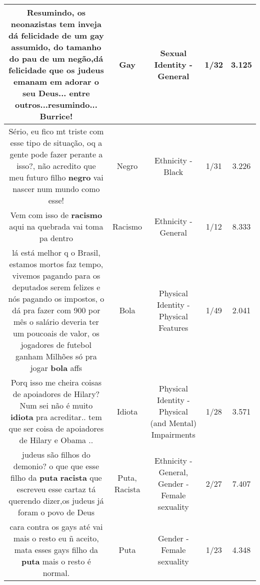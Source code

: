 \documentclass[11pt]{article}
\newlength\mylength
\begin{document}
\begin{center}
\begin{longtable}{|C{.65\mylength}|C{.30\mylength}|C{.12\mylength}|C{.12\mylength}|C{.12\mylength}|}
  \small Resumindo, os neonazistas tem inveja dá felicidade de um \textbf{gay} assumido, do tamanho do pau de um negão,dá felicidade que os judeus emanam em adorar o seu Deus... entre outros...resumindo... Burrice!\normalsize   & Gay & Sexual Identity - General & 1/32 & 3.125 \\  \hline
  \small Sério, eu fico mt triste com esse tipo de situação, oq a gente pode fazer perante a isso?, não acredito que meu futuro filho \textbf{negro} vai nascer num mundo como esse!\normalsize   & Negro & Ethnicity - Black & 1/31 & 3.226 \\  \hline
  \small Vem com isso de \textbf{racismo} aqui na quebrada vai toma pa dentro\normalsize   & Racismo & Ethnicity - General & 1/12 & 8.333 \\  \hline
  \small lá está melhor q o Brasil, estamos mortos faz tempo, vivemos pagando para os deputados serem felizes e nós pagando os impostos, o dá pra fazer com 900 por mês o salário deveria ter um poucoais de valor, os jogadores de futebol ganham Milhões só pra jogar \textbf{bola} affs\normalsize   & Bola & Physical Identity - Physical Features & 1/49 & 2.041 \\  \hline
  \small Porq isso me cheira coisas de apoiadores de Hilary? Num sei não é muito \textbf{idiota} pra acreditar.. tem que ser coisa de apoiadores de Hilary e Obama ..\normalsize   & Idiota & Physical Identity - Physical (and Mental) Impairments & 1/28 & 3.571 \\  \hline
  \small judeus são filhos do demonio? o que que esse filho da \textbf{puta} \textbf{racista} que escreveu esse cartaz tá querendo dizer,os judeus já foram o povo de Deus\normalsize   & Puta, Racista & Ethnicity - General, Gender - Female sexuality & 2/27 & 7.407 \\  \hline
  \small cara contra os gays até vai mais o resto eu ñ aceito,  mata esses gays filho da \textbf{puta} mais o resto é normal.\normalsize   & Puta & Gender - Female sexuality & 1/23 & 4.348 \\  \hline

\end{longtable}
\end{center}
\end{document}
